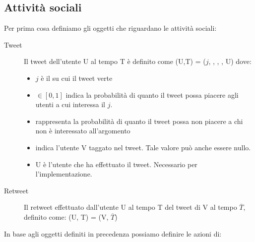 \subsection{Attivit\`a sociali}
\label{subsec:social}

Per prima cosa definiamo gli oggetti che riguardano le attivit\`a 
sociali:

\begin{description}
  \item[Tweet] Il tweet dell'utente U al tempo T \`e definito come
  \twt{}(U,T) = ($j$, \lika{}, \disla{}, \dtag, U) dove:
  \begin{itemize}
    \item $j$ \`e il \topic{} su cui il tweet verte
    \item \lika{} $\in [0,1]$ indica la probabilit\`a di quanto
    il tweet possa piacere agli utenti a cui interessa il 
    \topic{} $j$. 
    \item \disla{} rappresenta la probabilit\`a di quanto il tweet 
    possa non piacere a chi non \`e interessato all'argomento
    \item \dtag{} indica l'utente V taggato nel tweet. Tale valore 
    pu\`o anche essere nullo.
    \item U \`e l'utente che ha effettuato il tweet. 
    Necessario per l'implementazione.
  \end{itemize}
  \item[Retweet] Il retweet effettuato dall'utente U al tempo T
  del tweet di V al tempo $\overline{T}$, definito come:
  \retwt{}(U, T) = \twt{}(V, $\overline{T}$)
\end{description}

In base agli oggetti definiti in precedenza possiamo definire le 
azioni di:

